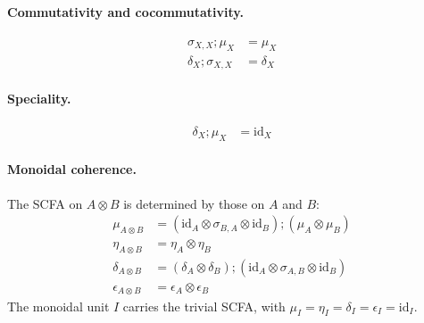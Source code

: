 \paragraph{Commutativity and cocommutativity.}
\begin{align}
  \sigma_{X,X} ; \mu_X &= \mu_X
    \label{eq:ax-comm}
    \tag{comm}\\
  \delta_X ; \sigma_{X,X} &= \delta_X
    \label{eq:ax-cocomm}
    \tag{cocomm}
\end{align}

\paragraph{Speciality.}
\begin{align}
  \delta_X ; \mu_X &= \mathrm{id}_X
    \label{eq:ax-special}
    \tag{special}
\end{align}

\paragraph{Monoidal coherence.}
The SCFA on $A \otimes B$ is determined by those on $A$ and $B$:
\begin{align}
  \mu_{A \otimes B}
    &= (\mathrm{id}_A \otimes \sigma_{B,A} \otimes \mathrm{id}_B)
       ; (\mu_A \otimes \mu_B)
    \label{eq:ax-coh-mu}
    \tag{coh-$\mu$}\\
  \eta_{A \otimes B}
    &= \eta_A \otimes \eta_B
    \label{eq:ax-coh-eta}
    \tag{coh-$\eta$}\\
  \delta_{A \otimes B}
    &= (\delta_A \otimes \delta_B)
       ; (\mathrm{id}_A \otimes \sigma_{A,B} \otimes \mathrm{id}_B)
    \label{eq:ax-coh-delta}
    \tag{coh-$\delta$}\\
  \epsilon_{A \otimes B}
    &= \epsilon_A \otimes \epsilon_B
    \label{eq:ax-coh-eps}
    \tag{coh-$\epsilon$}
\end{align}
The monoidal unit $I$ carries the trivial SCFA, with $\mu_I = \eta_I = \delta_I = \epsilon_I = \mathrm{id}_I$.
